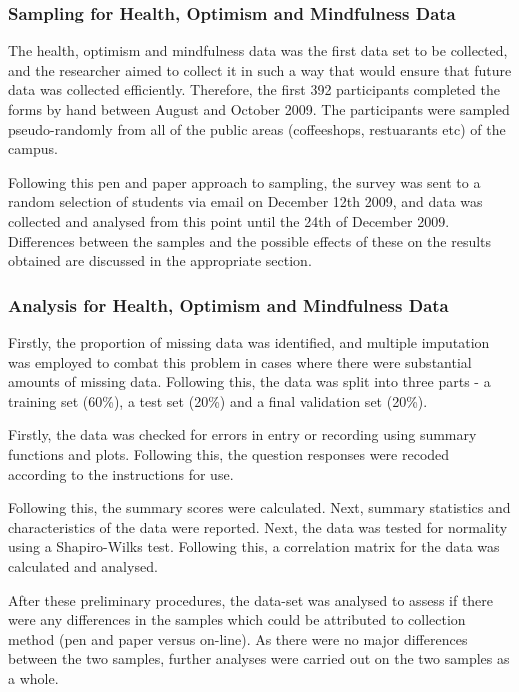 \subsubsection{Sampling for Health, Optimism and Mindfulness Data}

The health, optimism and mindfulness data was the first data set to be collected, and the researcher aimed to collect it in such a way that would ensure that future data was collected efficiently. Therefore, the first 392 participants completed the forms by hand between August and October 2009. The participants were sampled pseudo-randomly from all of the public areas (coffeeshops, restuarants etc) of the campus. 

Following this pen and paper approach to sampling, the survey was sent to a random selection of students via email on December 12th 2009, and data was collected and analysed from this point until the 24th of December 2009. Differences between the samples and the possible effects of these on the results obtained are discussed in the appropriate section. 

\subsubsection{Analysis for Health, Optimism and Mindfulness Data}
Firstly, the proportion of missing data was identified, and multiple imputation was employed to combat this problem in cases where there were substantial amounts of missing data. 
Following this, the data was split into three parts - a training set (60\%), a test  set (20\%) and a final validation set (20\%).  

Firstly, the data was checked for errors in entry or recording using summary functions and plots. Following this, the question responses were recoded according to the instructions for use. 

Following this, the summary scores were calculated. Next, summary statistics and characteristics of the data were reported. Next, the data was tested for normality using a Shapiro-Wilks test. Following this, a correlation matrix for the data was calculated and analysed.

After these preliminary procedures, the data-set was analysed to assess if there were any differences in the samples which could be attributed to collection method (pen and paper versus on-line). As there were no major differences between the two samples, further analyses were carried out on the two samples as a whole. 

